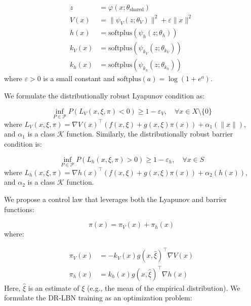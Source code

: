 \documentclass[11pt, oneside]{article}
\begin{document}
\begin{align}
    z &= \varphi(x; \theta_\text{shared}) \\
    V(x) &= \|\psi_V(z; \theta_V)\|^2 + \varepsilon\|x\|^2 \\
    h(x) &= \text{softplus}(\psi_h(z; \theta_h)) \\
    k_V(x) &= \text{softplus}(\psi_{k_V}(z; \theta_{k_V})) \\
    k_h(x) &= \text{softplus}(\psi_{k_h}(z; \theta_{k_h}))
\end{align}
%
where $\varepsilon > 0$ is a small constant and $\text{softplus}(a) = \log(1 + e^a)$.

 We formulate the distributionally robust Lyapunov condition as:

\begin{equation}
    \inf_{P\in\mathcal{P}} P(L_V(x,\xi,\pi) < 0) \geq 1 - \varepsilon_V, \quad \forall x \in X\setminus\{0\}
\end{equation}
%
where $L_V(x,\xi,\pi) = \nabla V(x)^\top(f(x,\xi) + g(x,\xi)\pi(x)) + \alpha_1(\|x\|)$, and $\alpha_1$ is a class $\mathcal{K}$ function. Similarly, the distributionally robust barrier condition is:

\begin{equation}
    \inf_{P\in\mathcal{P}} P(L_h(x,\xi,\pi) > 0) \geq 1 - \varepsilon_h, \quad \forall x \in S
\end{equation}
%
where $L_h(x,\xi,\pi) = \nabla h(x)^\top(f(x,\xi) + g(x,\xi)\pi(x)) + \alpha_2(h(x))$, and $\alpha_2$ is a class $\mathcal{K}$ function.

 We propose a control law that leverages both the Lyapunov and barrier functions:

\begin{equation}
    \pi(x) = \pi_V(x) + \pi_h(x)
\end{equation}
%
where:

\begin{align}
    \pi_V(x) &= -k_V(x)g(x,\hat{\xi})^\top\nabla V(x) \\
    \pi_h(x) &= k_h(x)g(x,\hat{\xi})^\top\nabla h(x)
\end{align}
%
Here, $\hat{\xi}$ is an estimate of $\xi$ (e.g., the mean of the empirical distribution). We formulate the DR-LBN training as an optimization problem:
\end{document}
